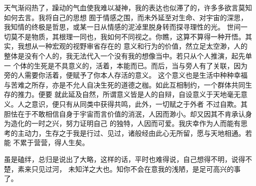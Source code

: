 \begin{adjustwidth}{0cm}{0cm}
{        \hspace*{2em} 天气渐闷热了，躁动的气血使我难以凝神，我的表达也似滞了的，许多多欲言莫知如何去言。我将自己的思想
        囿于情感之围，而未外延至对生命、对宇宙的深思，我知情的终极是哲思，或某一日从情感的泥淖里脱身转而探寻理性的光。
        世间一切莫不是物质，其根理一同也，我如何不同视之。你瞧，这算不算得一种开悟。其实，我想从一种宏观的视野审省存在的
        意义和行为的价值，然立足太空渺，人的整体是没有个人的，我无法代入一个没有我的想像当中。若只从个人推演，起先单一
        个体的生死是不具意义的，活着，本能而已。而后，当与旁人有了关联，因为旁的人需要你活着，便赋予了你本人存活的意义。
        这个意义也是生活中种种幸福与苦难之所存，亦是不允人自决生死的道德之枷。如此互相制约，一个群体共同生存的推力。便要
        就此延及自然，所谓意义皆是人的自辩，自设意义于天地毫无意义。人之意识，便只有从同类中获得共鸣，此外，一切赋之于外者
        不过自欺。其胆怯在于不敢相信自身于宇宙而言价值的消泯，人因而渺小。却又因其不肯承认身为造化的一时之兴，努力证明自己
        的独特，人因而可爱。我庆幸作为人而能有思考的主动力，生存之于我是行过、见过，诸般经由此心无所留，愿与天地相通。若能
        不累于营营，得人生矣。

        \hspace*{2em} 虽是磕绊，总归是说出了大略，这样的话，平时也难得说，自己想得不明，说得不楚，素来只见过河，
        未知洋之大也。知你不会在意我的浅陋，是足可高兴的事了。
        
}
\end{adjustwidth}
\newpage